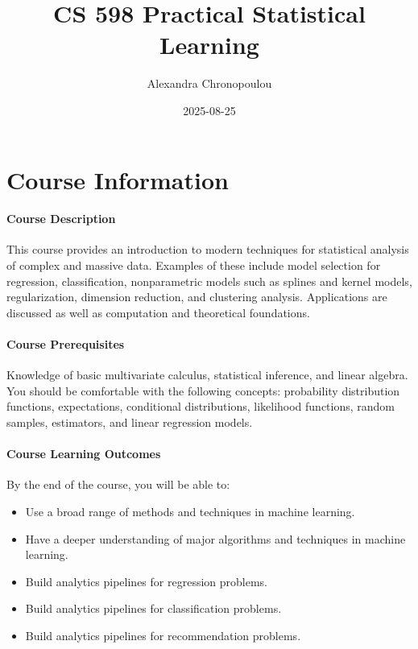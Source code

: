 \documentclass[
]{book}
\title{CS 598 Practical Statistical Learning}
\author{Alexandra Chronopoulou}
\date{2025-08-25}
\providecommand{\tightlist}{%
  \setlength{\itemsep}{0pt}\setlength{\parskip}{0pt}}
\begin{document}
\maketitle

{
\setcounter{tocdepth}{1}
\tableofcontents
}
\chapter*{\texorpdfstring{ Course Information }{ Course Information }}\label{course-information}

\subsubsection*{\texorpdfstring{ Course Description }{ Course Description }}\label{course-description}

This course provides an introduction to modern techniques for statistical analysis of complex and massive data. Examples of these include model selection for regression, classification, nonparametric models such as splines and kernel models, regularization, dimension reduction, and clustering analysis. Applications are discussed as well as computation and theoretical foundations.

\subsubsection*{\texorpdfstring{Course Prerequisites }{Course Prerequisites }}\label{course-prerequisites}

Knowledge of basic multivariate calculus, statistical inference, and linear algebra. You should be comfortable with the following concepts: probability distribution functions, expectations, conditional distributions, likelihood functions, random samples, estimators, and linear regression models.

\subsubsection*{\texorpdfstring{ Course Learning Outcomes }{ Course Learning Outcomes }}\label{course-learning-outcomes}

By the end of the course, you will be able to:

\begin{itemize}
\tightlist
\item
  Use a broad range of methods and techniques in machine learning.
\item
  Have a deeper understanding of major algorithms and techniques in machine learning.
\item
  Build analytics pipelines for regression problems.
\item
  Build analytics pipelines for classification problems.
\item
  Build analytics pipelines for recommendation problems.
\end{itemize}
\end{document}
